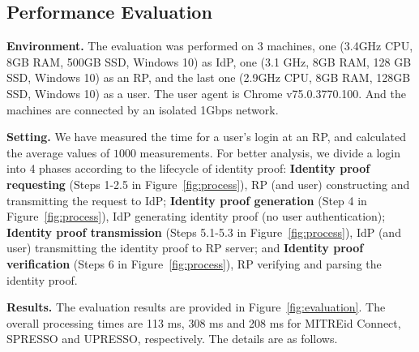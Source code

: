 \subsection{Performance Evaluation}
\label{sec:evaluation}
\noindent\textbf{Environment.} The evaluation was performed on 3 machines, one (3.4GHz CPU, 8GB RAM, 500GB SSD, Windows 10) as IdP, one (3.1 GHz, 8GB RAM, 128 GB SSD, Windows 10) as an RP, and the last one (2.9GHz CPU, 8GB RAM, 128GB SSD, Windows 10) as a user. The user agent is Chrome v75.0.3770.100. And the machines are connected by an isolated 1Gbps network. 


\noindent\textbf{Setting.} We have measured the time for a user's login at an RP, and calculated the average values of $1000$ measurements.
For better analysis, we divide a login into 4 phases according to the lifecycle of identity proof: \textbf{Identity proof requesting} (Steps 1-2.5 in Figure~\ref{fig:process}), RP (and user) constructing and transmitting the request to IdP; \textbf{Identity proof generation} (Step 4 in Figure~\ref{fig:process}), IdP generating identity proof (no user authentication); \textbf{Identity proof transmission} (Steps 5.1-5.3 in Figure~\ref{fig:process}), IdP (and user) transmitting the identity proof to RP server; and \textbf{Identity proof verification} (Steps 6 in Figure~\ref{fig:process}), RP verifying and parsing the identity proof.

\noindent\textbf{Results.}
The evaluation results are provided in Figure~\ref{fig:evaluation}. The overall processing times are  113 ms, 308 ms and 208 ms for MITREid Connect, SPRESSO and UPRESSO, respectively. The details are as follows.

